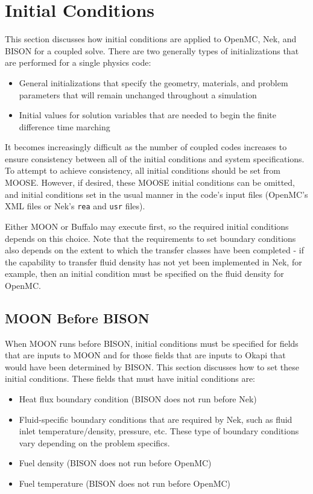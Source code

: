 \documentclass[10pt]{article}
\numberwithin{equation}{section} %
\begin{document}
\clearpage
\section{Initial Conditions}
\label{sec:ICs}
This section discusses how initial conditions are applied to OpenMC, Nek, and BISON for a coupled solve. There are two generally types of initializations that are performed for a single physics code:

\begin{itemize}
\item General initializations that specify the geometry, materials, and problem parameters that will remain unchanged throughout a simulation
\item Initial values for solution variables that are needed to begin the finite difference time marching
\end{itemize}

It becomes increasingly difficult as the number of coupled codes increases to ensure consistency between all of the initial conditions and system specifications. To attempt to achieve consistency, all initial conditions should be set from MOOSE. However, if desired, these MOOSE initial conditions can be omitted, and initial conditions set in the usual manner in the code's input files (OpenMC's XML files or Nek's {\tt rea} and {\tt usr} files). 

Either MOON or Buffalo may execute first, so the required initial conditions depends on this choice. Note that the requirements to set boundary conditions also depends on the extent to which the transfer classes have been completed - if the capability to transfer fluid density has not yet been implemented in Nek, for example, then an initial condition must be specified on the fluid density for OpenMC. 

\subsection{MOON Before BISON}
When MOON runs before BISON, initial conditions must be specified for fields that are inputs to MOON and for those fields that are inputs to Okapi that would have been determined by BISON. This section discusses how to set these initial conditions. These fields that must have initial conditions are:

\begin{itemize}
\item Heat flux boundary condition (BISON does not run before Nek)
\item Fluid-specific boundary conditions that are required by Nek, such as fluid inlet temperature/density, pressure, etc. These type of boundary conditions vary depending on the problem specifics.
\item Fuel density (BISON does not run before OpenMC)
\item Fuel temperature (BISON does not run before OpenMC)
\end{itemize}
\end{document}
